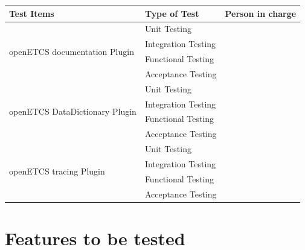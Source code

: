 \begin{center}
\begin{longtable}[H]{|p{6cm}|p{4cm}|p{4cm}|}\hline
\textbf{Test Items} & \textbf{Type of Test} & \textbf{Person in charge}\\\hline
\multirow{4}{*}{openETCS documentation Plugin} & Unit Testing & \\\cline{2-3} & Integration Testing & \\\cline{2-3} & Functional Testing & \\\cline{2-3} & Acceptance Testing & \\\hline
\multirow{4}{*}{openETCS DataDictionary Plugin} & Unit Testing & \\\cline{2-3} & Integration Testing & \\\cline{2-3} & Functional Testing & \\\cline{2-3} & Acceptance Testing & \\\hline
\multirow{4}{*}{openETCS tracing Plugin} & Unit Testing & \\\cline{2-3} & Integration Testing & \\\cline{2-3} & Functional Testing & \\\cline{2-3} & Acceptance Testing & \\\hline
\end{longtable}
\end{center}


\section{Features to be tested}
\label{sec:features_test}

